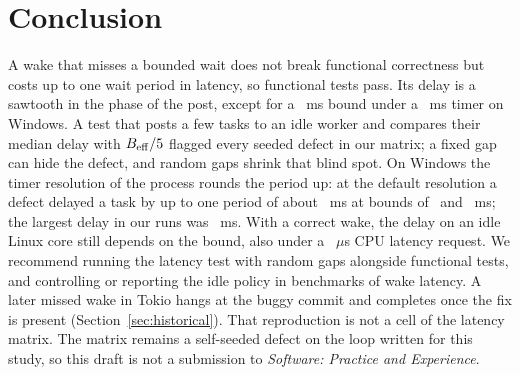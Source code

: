 \section{Conclusion}

A wake that misses a bounded wait does not break functional correctness but costs up to one
wait period in latency, so functional tests pass. Its delay is a sawtooth in the phase of the
post, except for a \WakeBSmallMs~ms bound under a \WakeTimerRequestedMs~ms timer on Windows. A
test that posts a few tasks to an idle worker and compares their median delay with
$B_{\mathrm{eff}}/5$ flagged every seeded defect in our matrix; a fixed gap can hide the
defect, and random gaps shrink that blind spot. On Windows the timer resolution of the process
rounds the period up: at the default resolution a defect delayed a task by up to one period of
about \WakeWinDefaultTickMs~ms at bounds of \WakeBSmallMs\ and \WakeBMidMs~ms; the largest delay
in our runs was \WakeIocpDefectMaxMsDefaultTimer~ms. With a correct wake, the delay on an idle Linux
core still depends on the bound, also under a \WakeQosUs~$\mu$s CPU latency request. We
recommend running the latency test with random gaps alongside functional tests, and controlling
or reporting the idle policy in benchmarks of wake latency. A later missed wake in Tokio
hangs at the buggy commit and completes once the fix is present
(Section~\ref{sec:historical}). That reproduction is not a cell of the latency matrix. The
matrix remains a self-seeded defect on the loop written for this study, so this draft is
not a submission to \emph{Software: Practice and Experience}.





